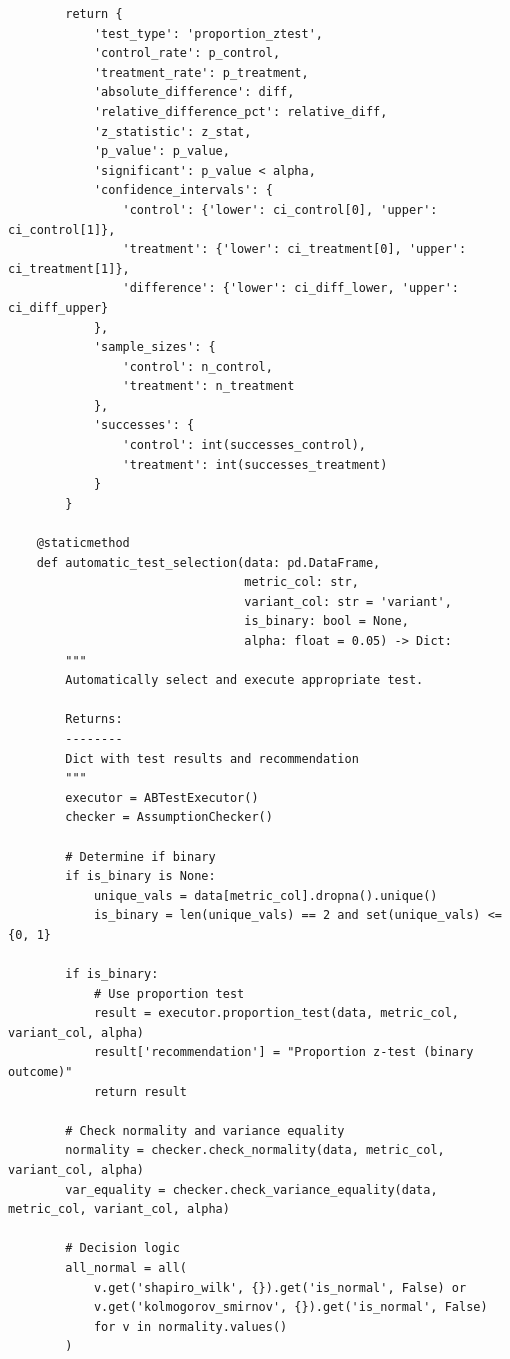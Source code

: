 \begin{lstlisting}
        return {
            'test_type': 'proportion_ztest',
            'control_rate': p_control,
            'treatment_rate': p_treatment,
            'absolute_difference': diff,
            'relative_difference_pct': relative_diff,
            'z_statistic': z_stat,
            'p_value': p_value,
            'significant': p_value < alpha,
            'confidence_intervals': {
                'control': {'lower': ci_control[0], 'upper': ci_control[1]},
                'treatment': {'lower': ci_treatment[0], 'upper': ci_treatment[1]},
                'difference': {'lower': ci_diff_lower, 'upper': ci_diff_upper}
            },
            'sample_sizes': {
                'control': n_control,
                'treatment': n_treatment
            },
            'successes': {
                'control': int(successes_control),
                'treatment': int(successes_treatment)
            }
        }

    @staticmethod
    def automatic_test_selection(data: pd.DataFrame,
                                 metric_col: str,
                                 variant_col: str = 'variant',
                                 is_binary: bool = None,
                                 alpha: float = 0.05) -> Dict:
        """
        Automatically select and execute appropriate test.

        Returns:
        --------
        Dict with test results and recommendation
        """
        executor = ABTestExecutor()
        checker = AssumptionChecker()

        # Determine if binary
        if is_binary is None:
            unique_vals = data[metric_col].dropna().unique()
            is_binary = len(unique_vals) == 2 and set(unique_vals) <= {0, 1}

        if is_binary:
            # Use proportion test
            result = executor.proportion_test(data, metric_col, variant_col, alpha)
            result['recommendation'] = "Proportion z-test (binary outcome)"
            return result

        # Check normality and variance equality
        normality = checker.check_normality(data, metric_col, variant_col, alpha)
        var_equality = checker.check_variance_equality(data, metric_col, variant_col, alpha)

        # Decision logic
        all_normal = all(
            v.get('shapiro_wilk', {}).get('is_normal', False) or
            v.get('kolmogorov_smirnov', {}).get('is_normal', False)
            for v in normality.values()
        )


\end{lstlisting}
